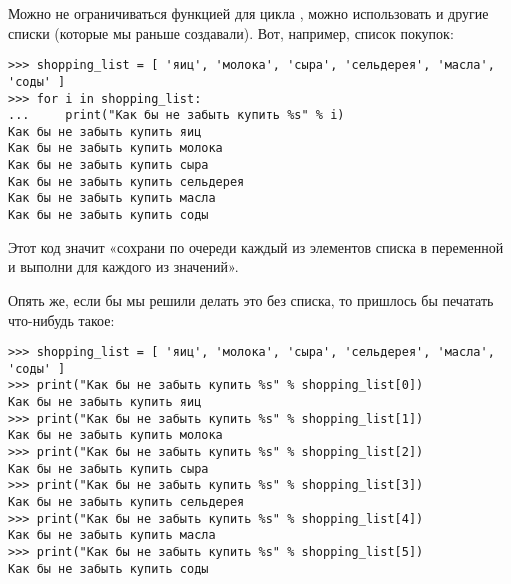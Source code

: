 \linebreak

Можно не ограничиваться функцией  для цикла , можно использовать и другие списки (которые мы раньше создавали). Вот, например, список покупок:

\begin{listing}
\begin{verbatim}
>>> shopping_list = [ 'яиц', 'молока', 'сыра', 'сельдерея', 'масла', 'соды' ]
>>> for i in shopping_list:
...     print("Как бы не забыть купить %s" % i)
Как бы не забыть купить яиц
Как бы не забыть купить молока
Как бы не забыть купить сыра
Как бы не забыть купить сельдерея
Как бы не забыть купить масла
Как бы не забыть купить соды
\end{verbatim}
\end{listing}

Этот код значит «сохрани по очереди каждый из элементов списка в переменной  и выполни  для каждого из значений».

Опять же, если бы мы решили делать это без списка, то пришлось бы печатать что-нибудь такое:

\begin{listing}
\begin{verbatim}
>>> shopping_list = [ 'яиц', 'молока', 'сыра', 'сельдерея', 'масла', 'соды' ]
>>> print("Как бы не забыть купить %s" % shopping_list[0])
Как бы не забыть купить яиц
>>> print("Как бы не забыть купить %s" % shopping_list[1])
Как бы не забыть купить молока
>>> print("Как бы не забыть купить %s" % shopping_list[2])
Как бы не забыть купить сыра
>>> print("Как бы не забыть купить %s" % shopping_list[3])
Как бы не забыть купить сельдерея
>>> print("Как бы не забыть купить %s" % shopping_list[4])
Как бы не забыть купить масла
>>> print("Как бы не забыть купить %s" % shopping_list[5])
Как бы не забыть купить соды
\end{verbatim}
\end{listing}

